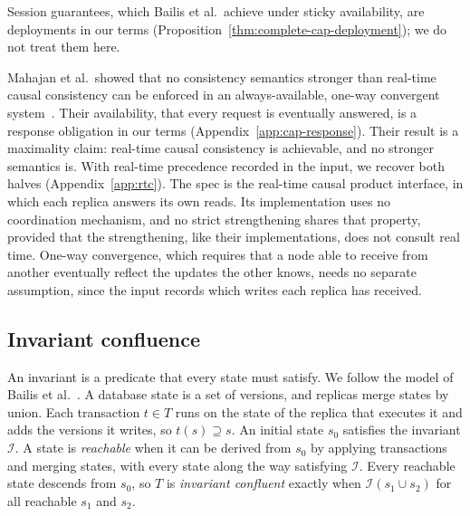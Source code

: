 \documentclass[sigconf]{cidr-2027}
\theoremstyle{remark}
\begin{document}
Session guarantees, which Bailis et al.\ achieve under sticky availability,
are deployments in our terms (Proposition~\ref{thm:complete-cap-deployment});
we do not treat them here.

Mahajan et al.\ showed that no consistency semantics stronger than real-time
causal consistency can be enforced in an always-available, one-way convergent
system~\cite{mahajan2011consistency}.  Their availability, that every
request is eventually answered, is a response obligation in our terms
(Appendix~\ref{app:cap-response}).  Their result is a maximality claim:
real-time causal consistency is achievable, and no stronger semantics is.
With real-time precedence recorded in the input, we recover both halves
(Appendix~\ref{app:rtc}).  The spec is the real-time causal product
interface, in which each replica answers its own reads.  Its implementation
uses no coordination mechanism, and no strict strengthening shares that
property, provided that the strengthening, like their implementations, does not
consult real time.  One-way convergence, which requires that a node able to
receive from another eventually reflect the updates the other knows, needs no
separate assumption, since the input records which writes each replica has
received.

\subsection{Invariant confluence}
\label{sec:iconfluence-instance}

An invariant is a predicate that every state must satisfy.  We follow the model
of Bailis et al.~\cite{bailis2014coordination}.  A database state is a set of
versions, and replicas merge states by union.  Each transaction $t\in T$ runs
on the state of the replica that executes it and adds the versions it writes,
so $t(s)\supseteq s$.  An initial state $s_0$ satisfies the invariant
$\mathcal I$.  A state is \emph{reachable} when it can be derived from $s_0$ by
applying transactions and merging states, with every state along the way
satisfying $\mathcal I$.  Every reachable state descends from $s_0$, so $T$ is
\emph{invariant confluent} exactly when $\mathcal I(s_1\cup s_2)$ for all
reachable $s_1$ and $s_2$.
\end{document}
